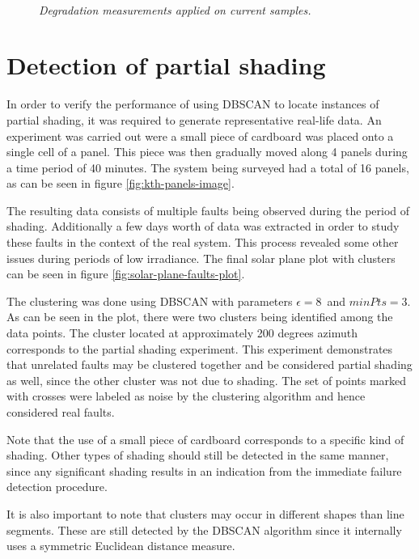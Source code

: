 \begin{figure}[here]
\centering
{}
~
\caption[Performance of distance-based method (current)]{\emph{Degradation measurements applied on current samples.}}
\end{figure}

\clearpage
\section{Detection of partial shading}
In order to verify the performance of using DBSCAN to locate instances of partial shading, it was required to generate representative real-life data.
An experiment was carried out were a small piece of cardboard was placed onto a single cell of a panel.
This piece was then gradually moved along 4 panels during a time period of 40 minutes.
The system being surveyed had a total of 16 panels, as can be seen in figure \ref{fig:kth-panels-image}.

The resulting data consists of multiple faults being observed during the period of shading.
Additionally a few days worth of data was extracted in order to study these faults in the context of the real system.
This process revealed some other issues during periods of low irradiance.
The final solar plane plot with clusters can be seen in figure \ref{fig:solar-plane-faults-plot}.

The clustering was done using DBSCAN with parameters $\epsilon = 8$ and $minPts = 3$.
As can be seen in the plot, there were two clusters being identified among the data points.
The cluster located at approximately 200 degrees azimuth corresponds to the partial shading experiment.
This experiment demonstrates that unrelated faults may be clustered together and be considered partial shading as well, since the other cluster was not due to shading.
The set of points marked with crosses were labeled as noise by the clustering algorithm and hence considered real faults.

Note that the use of a small piece of cardboard corresponds to a specific kind of shading.
Other types of shading should still be detected in the same manner, since any significant shading results in an indication from the immediate failure detection procedure.

It is also important to note that clusters may occur in different shapes than line segments.
These are still detected by the DBSCAN algorithm since it internally uses a symmetric Euclidean distance measure.

